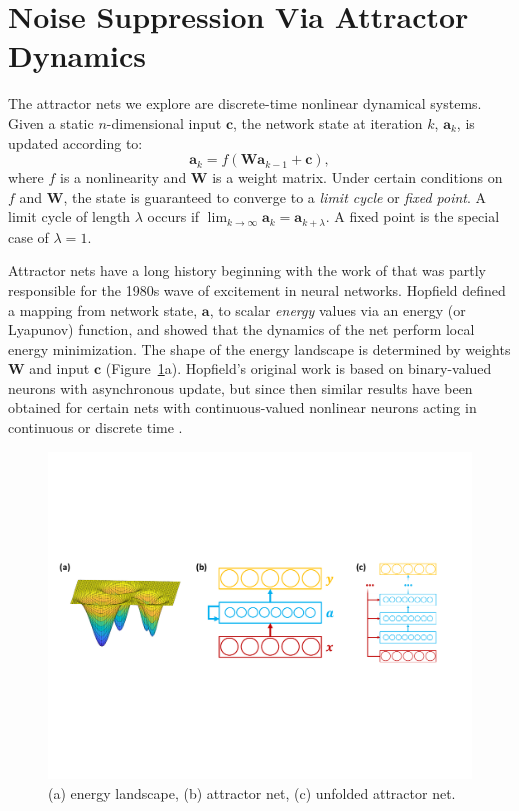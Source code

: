 \documentclass{article}
\newcommand{\cue}{{\ensuremath{\bm{c}}}}
\begin{document}
\section{Noise Suppression Via Attractor Dynamics}

The attractor nets we explore are discrete-time nonlinear dynamical systems.
Given a static $n$-dimensional input $\cue$, the network state at iteration
$k$, $\bm{a}_k$, is updated according to:
\begin{equation}
\bm{a}_{k} = f \left( \bm{W} \bm{a}_{k-1} + \cue \right) ,
\label{eq:att_dyn}
\end{equation}
where $f$ is a nonlinearity and $\bm{W}$ is a weight matrix.  Under certain
conditions on $f$ and $\bm{W}$, the state is guaranteed to converge to a
\emph{limit cycle} or \emph{fixed point}. A limit cycle of length $\lambda$
occurs if $\lim_{k\to\infty} \bm{a}_k = \bm{a}_{k+\lambda}$. A fixed point is
the special case of $\lambda=1$.

Attractor nets have a long history beginning with the work of
\cite{Hopfield1982} that was partly responsible for the 1980s wave of
excitement in neural networks.  Hopfield defined a mapping from network state,
$\bm{a}$, to scalar \emph{energy} values via an energy (or Lyapunov) function,
and showed that the dynamics of the net perform local energy minimization. The
shape of the energy landscape is determined by weights $\bm{W}$ and input
$\cue$ (Figure~\ref{fig:energy}a).  Hopfield's original work is based on
binary-valued neurons with asynchronous update, but since then similar results
have been obtained for certain nets with continuous-valued nonlinear neurons
acting in continuous \citep{Hopfield1984} or discrete time \citep{Koiran1994}.
\begin{figure}[bt]%
   \begin{center}
   \includegraphics[width=5.5in]{fig/arch.pdf}
   \end{center}
   \caption{(a) energy landscape, (b) attractor net, (c) unfolded attractor net.}
   \label{fig:energy}
\end{figure}
\end{document}
